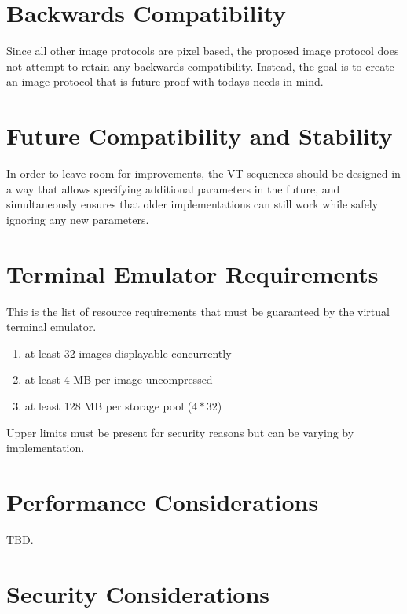 \documentclass{article}
\begin{document}
\section{Backwards Compatibility} %

Since all other image protocols are pixel based, the proposed image protocol does not
attempt to retain any backwards compatibility. Instead, the goal is to create
an image protocol that is future proof with todays needs in mind.

\section{Future Compatibility and Stability} %

In order to leave room for improvements, the VT sequences should be designed in a way
that allows specifying additional parameters in the future, and simultaneously ensures
that older implementations can still work while safely ignoring any new parameters.

\section{Terminal Emulator Requirements} %

This is the list of resource requirements that must be guaranteed by the virtual terminal emulator.

\begin{enumerate}
    \item at least 32 images displayable concurrently
    \item at least 4 MB per image uncompressed
    \item at least 128 MB per storage pool (\(4 * 32\))
\end{enumerate}

Upper limits must be present for security reasons but can be varying by implementation.


\section{Performance Considerations} %

TBD.

\section{Security Considerations} %
\end{document}
